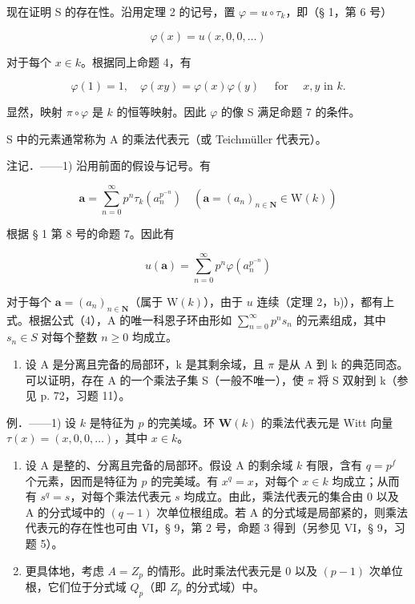 现在证明 S 的存在性。沿用定理 2 的记号，置 \(\varphi = u \circ \tau_k\)，即（§ 1，第 6 号）

\[
\varphi (x) = u (x, 0, 0, \dots)\tag{2}
\]

对于每个 \(x \in k\)。根据同上命题 4，有

\[
\varphi (1) = 1, \quad \varphi (x y) = \varphi (x) \varphi (y) \quad \text { for } \quad x, y \text {   in   } k.\tag{3}
\]

显然，映射 \(\pi \circ \varphi\) 是 \(k\) 的恒等映射。因此 \(\varphi\) 的像 S 满足命题 7 的条件。

S 中的元素通常称为 A 的乘法代表元（或 Teichmüller 代表元）。

注记．——1) 沿用前面的假设与记号。有

\[
\boldsymbol {a} = \sum_ {n = 0} ^ {\infty} p ^ {n} \tau_ {k} (a _ {n} ^ {p ^ {- n}}) \quad (\boldsymbol {a} = (a _ {n}) _ {n \in \mathbf {N}} \in \mathrm{W} (k))
\]

根据 § 1 第 8 号的命题 7。因此有

\[
u (\boldsymbol {a}) = \sum_ {n = 0} ^ {\infty} p ^ {n} \varphi (a _ {n} ^ {p ^ {- n}})\tag{4}
\]

对于每个 \(\boldsymbol{a} = (a_n)_{n \in \mathbf{N}}\)（属于 \(\mathrm{W}(k)\)），由于 \(u\) 连续（定理 2，b)），都有上式。根据公式（4），A 的唯一科恩子环由形如 \(\sum_{n=0}^{\infty} p^n s_n\) 的元素组成，其中 \(s_n \in S\) 对每个整数 \(n \geqslant 0\) 均成立。

\begin{enumerate}
\def\labelenumi{\arabic{enumi})}
\setcounter{enumi}{1}
\tightlist
\item
  设 A 是分离且完备的局部环，k 是其剩余域，且 \(\pi\) 是从 A 到 k 的典范同态。可以证明，存在 A 的一个乘法子集 S（一般不唯一），使 \(\pi\) 将 S 双射到 k（参见 p. 72，习题 11）。
\end{enumerate}

例．——1) 设 \(k\) 是特征为 \(p\) 的完美域。环 \(\mathbf{W}(k)\) 的乘法代表元是 Witt 向量 \(\tau(x) = (x, 0, 0, \ldots)\)，其中 \(x \in k\)。

\begin{enumerate}
\def\labelenumi{\arabic{enumi})}
\setcounter{enumi}{1}
\item
  设 A 是整的、分离且完备的局部环。假设 A 的剩余域 \(k\) 有限，含有 \(q = p^{f}\) 个元素，因而是特征为 \(p\) 的完美域。有 \(x^{q} = x\)，对每个 \(x \in k\) 均成立；从而有 \(s^{q} = s\)，对每个乘法代表元 \(s\) 均成立。由此，乘法代表元的集合由 0 以及 A 的分式域中的 \((q - 1)\) 次单位根组成。若 A 的分式域是局部紧的，则乘法代表元的存在性也可由 VI，§ 9，第 2 号，命题 3 得到（另参见 VI，§ 9，习题 5）。
\item
  更具体地，考虑 \(A = Z_{p}\) 的情形。此时乘法代表元是 0 以及 \((p - 1)\) 次单位根，它们位于分式域 \(Q_{p}\)（即 \(Z_{p}\) 的分式域）中。
\end{enumerate}

